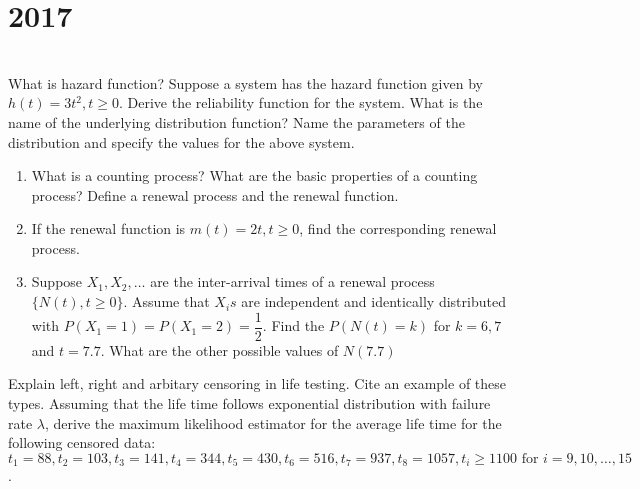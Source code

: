 \section*{2017}
\vspace{-.5cm}
\hrulefill \smallskip\\
 What is hazard function? Suppose a system has the hazard function given by $h(t) = 3t^2, t \geq 0$. Derive the reliability function for the system. What is the name of the underlying distribution function? Name the parameters of the distribution and specify the values for the above system.
\myline
{} \begin{enumerate}[topsep=0pt, itemsep = -1ex,label=(\roman*)]
    \item What is a counting process? What are the basic properties of a counting process? Define a renewal process and the renewal function.
    \item If the renewal function is $m(t) =2t, t\geq 0$, find the corresponding renewal process.
    \item Suppose $X_1,X_2, \ldots$ are the inter-arrival times of a renewal process $\{N(t), t\geq0 \}$. Assume that $X_i s $ are independent and identically distributed with $P(X_1=1) = P(X_1 =2) =  \dfrac{1}{2}$. Find the $P(N(t)=k)$ for $k=6,7$ and $t=7.7$. What are the other possible values of $N(7.7)$
\end{enumerate} 
\myline
{} Explain left, right and arbitary censoring in life testing. Cite an example of these types. Assuming that the life time follows exponential distribution with failure rate $\lambda$, derive the maximum likelihood estimator for the average life time for the following censored data:\\
$t_1=88,t_2=103,t_3=141,t_4=344,t_5=430,t_6=516,t_7=937,t_8=1057,t_i\geq 1100 \text{ for }i=9,10,\ldots,15$.